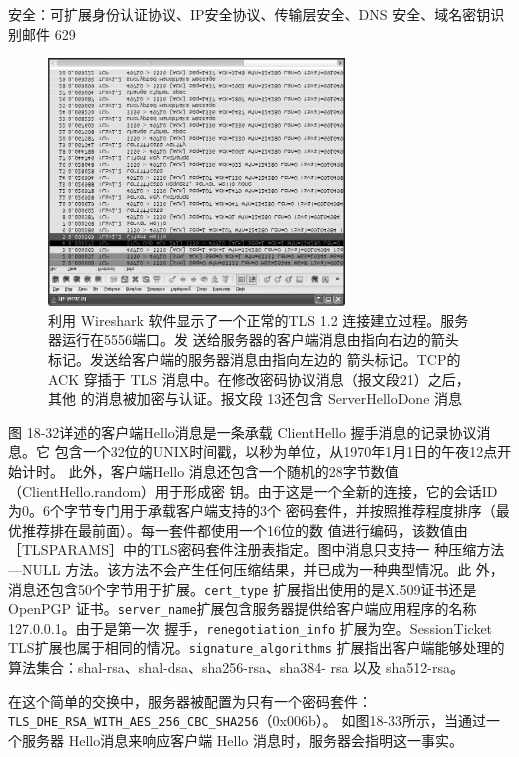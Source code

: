 安全：可扩展身份认证协议、IP安全协议、传输层安全、DNS 安全、域名密钥识别邮件 629
\begin{figure}[!htb]
    \centering
	\includegraphics[width=0.7\textwidth]{imgs/18/18-31.png}
	\caption{利用 Wireshark 软件显示了一个正常的TLS 1.2 连接建立过程。服务器运行在5556端口。发
            送给服务器的客户端消息由指向右边的箭头标记。发送给客户端的服务器消息由指向左边的
            箭头标记。TCP的ACK 穿插于 TLS 消息中。在修改密码协议消息（报文段21）之后，其他
            的消息被加密与认证。报文段 13还包含 ServerHelloDone 消息}
\end{figure}
图 18-32详述的客户端Hello消息是一条承载 ClientHello 握手消息的记录协议消息。它
包含一个32位的UNIX时间戳，以秒为单位，从1970年1月1日的午夜12点开始计时。
此外，客户端Hello 消息还包含一个随机的28字节数值（ClientHello.random）用于形成密
钥。由于这是一个全新的连接，它的会话ID 为0。6个字节专门用于承载客户端支持的3个
密码套件，并按照推荐程度排序（最优推荐排在最前面）。每一套件都使用一个16位的数
值进行编码，该数值由［TLSPARAMS］中的TLS密码套件注册表指定。图中消息只支持一
种压缩方法—NULL 方法。该方法不会产生任何压缩结果，并已成为一种典型情况。此
外，消息还包含50个字节用于扩展。\verb|cert_type| 扩展指出使用的是X.509证书还是 OpenPGP
证书。\verb|server_name|扩展包含服务器提供给客户端应用程序的名称127.0.0.1。由于是第一次
握手，\verb|renegotiation_info| 扩展为空。SessionTicket TLS扩展也属于相同的情况。\verb|signature_algorithms|
扩展指出客户端能够处理的算法集合：shal-rsa、shal-dsa、sha256-rsa、sha384-
rsa 以及 sha512-rsa。

在这个简单的交换中，服务器被配置为只有一个密码套件：\verb|TLS_DHE_RSA_WITH_AES_256_CBC_SHA256|（0x006b）。
如图18-33所示，当通过一个服务器 Hello消息来响应客户端 Hello 消息时，服务器会指明这一事实。

